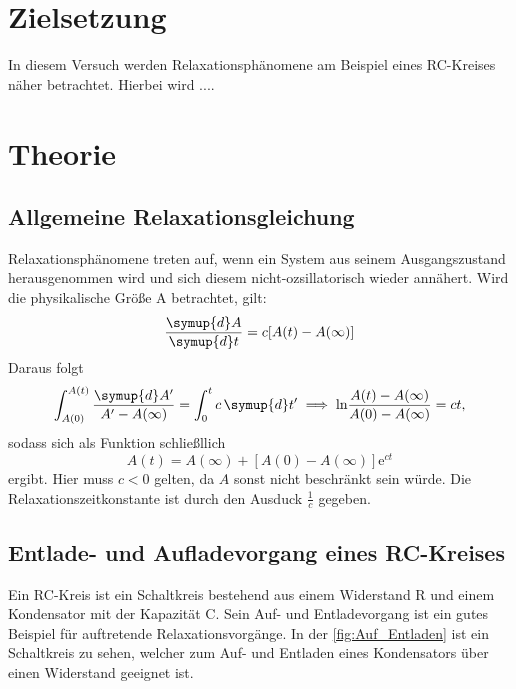 \section{Zielsetzung}

In diesem Versuch werden Relaxationsphänomene am Beispiel eines RC-Kreises näher betrachtet. Hierbei wird ....
\section{Theorie}
\label{sec:Theorie}

\subsection{Allgemeine Relaxationsgleichung}

    Relaxationsphänomene treten auf, wenn ein System aus seinem Ausgangszustand herausgenommen wird und sich diesem nicht-ozsillatorisch wieder annähert.
    Wird die physikalische Größe A betrachtet, gilt:
    \begin{equation} \label{eq:relaxation}
        \frac{\symup{d}A}{\symup{d}t}=c[A(t)-A(\infty)]
    \end{equation}
    Daraus folgt 
    \begin{equation*}
        \int_{A(0)}^{A(t)} \frac{\symup{d}A'}{A' - A(\infty)} = \int_0^t c \,\symup{d}t' \implies \text{ln} \frac{A(t) - A(\infty)}{A(0) - A(\infty)} = ct,
    \end{equation*}
    sodass sich als Funktion schließllich
    \begin{equation*}
        A(t) = A(\infty) + [A(0) - A(\infty)] \text{e}^{ct}
    \end{equation*}
    ergibt. Hier muss $c<0$ gelten, da $A$ sonst nicht beschränkt sein würde. Die Relaxationszeitkonstante ist durch den Ausduck $\frac{1}{c}$ gegeben.


\subsection{Entlade- und Aufladevorgang eines RC-Kreises}

    Ein RC-Kreis ist ein Schaltkreis bestehend aus einem Widerstand R und einem Kondensator mit der Kapazität C. Sein Auf- und Entladevorgang ist ein gutes Beispiel 
    für auftretende Relaxationsvorgänge. In der \autoref{fig:Auf_Entladen} ist ein Schaltkreis zu sehen, welcher zum Auf- und Entladen eines Kondensators über einen 
    Widerstand geeignet ist.

